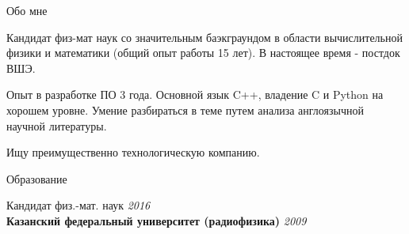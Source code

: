 \documentclass[
	a4paper, %
	11pt, %
]{resume} %
\begin{document}

\begin{rSection}{Обо мне}
	\item Кандидат физ-мат наук со значительным баэкграундом в области вычислительной физики и математики
	(общий опыт работы 15 лет). В настоящее время - постдок ВШЭ.
	\item Опыт в разработке ПО 3 года. Основной язык C++, владение C и
	Python на хорошем уровне. Умение разбираться в теме путем анализа англоязычной научной литературы.
	\item Ищу преимущественно технологическую	компанию.
\end{rSection}

\begin{rSection}{Образование}

	Кандидат физ.-мат. наук \hfill \textit{2016} \\
	\textbf{Казанский федеральный университет (радиофизика)} \hfill \textit{2009} \\

\end{rSection}

\end{document}

